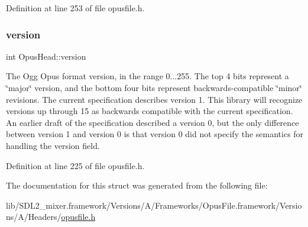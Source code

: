 Definition at line 253 of file opusfile.\+h.

\mbox{\label{struct_opus_head_a9b0e040fc6404ddc2b1fdbccf505f71e}} 
\subsubsection{\texorpdfstring{version}{version}}
{\footnotesize\ttfamily int Opus\+Head\+::version}

The Ogg Opus format version, in the range 0...255. The top 4 bits represent a \char`\"{}major\char`\"{} version, and the bottom four bits represent backwards-\/compatible \char`\"{}minor\char`\"{} revisions. The current specification describes version 1. This library will recognize versions up through 15 as backwards compatible with the current specification. An earlier draft of the specification described a version 0, but the only difference between version 1 and version 0 is that version 0 did not specify the semantics for handling the version field. 

Definition at line 225 of file opusfile.\+h.



The documentation for this struct was generated from the following file\+:\begin{DoxyCompactItemize}
\item 
lib/\+S\+D\+L2\+\_\+mixer.\+framework/\+Versions/\+A/\+Frameworks/\+Opus\+File.\+framework/\+Versions/\+A/\+Headers/\mbox{\hyperlink{opusfile_8h}{opusfile.\+h}}\end{DoxyCompactItemize}
